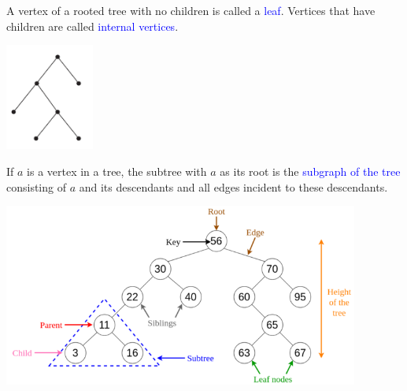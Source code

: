 \documentclass[aspectratio=169]{beamer}
\providecommand{\Blue}[1]{\textcolor{blue}{#1}}
\begin{document}
\begin{frame}[plain]{ }
  
  A vertex of a rooted tree with no children is called a \Blue{leaf}. 
    Vertices that have children are called \Blue{internal vertices}.
    
    \begin{center}
        \includegraphics[height=3.5cm]{./img/lecture9-fig9.png}
      \end{center}
   \pause
   
    If $a$ is a vertex in a tree, the subtree with $a$ as its root is 
    the \Blue{subgraph of the tree} consisting of $a$
    and its descendants and all edges incident to these descendants.
    
\end{frame}

\begin{frame}[plain]{}

 \begin{center}
  \includegraphics[height=6cm]{./img/lecture9-fig13.png}
 \end{center}
 
\end{frame}


\end{document}
